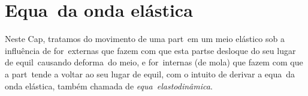
\chapter{Equa\cao\ da onda el\'astica}

Neste Cap\itulo, tratamos do movimento de uma part\icula\ em um meio
el\'astico sob a influ\^encia de for\cas\ externas que fazem com que esta
part\icula se desloque do seu lugar de equil\ibrio\ causando
deforma\coes\ do meio, e for\cas\ internas
(de mola) que fazem com que a part\icula\ tende a voltar ao seu lugar de
equil\ibrio, com o intuito de derivar a equa\cao\ da onda el\'astica,
tamb\'em chamada de {\it equa\cao\ elastodin\^amica}.
